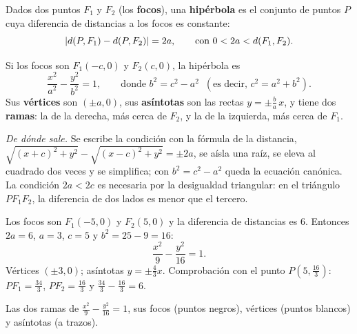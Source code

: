 \documentclass[11pt]{article}
\begin{document}
\begin{definicion}[Hipérbola]
Dados dos puntos $F_1$ y $F_2$ (los \textbf{focos}), una \textbf{hipérbola} es el
conjunto de puntos $P$ cuya diferencia de distancias a los focos es constante:
\[ \lvert d(P, F_1) - d(P, F_2)\rvert = 2a, \qquad \text{con } 0 < 2a < d(F_1, F_2). \]
\end{definicion}

\begin{teorema}
Si los focos son $F_1(-c, 0)$ y $F_2(c, 0)$, la hipérbola es
\[
  \frac{x^2}{a^2} - \frac{y^2}{b^2} = 1, \qquad \text{donde } b^2 = c^2 - a^2
  \;\;(\text{es decir, } c^2 = a^2 + b^2).
\]
Sus \textbf{vértices} son $(\pm a, 0)$, sus \textbf{asíntotas} son las rectas
$y = \pm \frac{b}{a}\,x$, y tiene dos \textbf{ramas}: la de la derecha, más cerca de
$F_2$, y la de la izquierda, más cerca de $F_1$.
\end{teorema}

\emph{De dónde sale.} Se escribe la condición con la fórmula de la distancia,
$\sqrt{(x + c)^2 + y^2} - \sqrt{(x - c)^2 + y^2} = \pm 2a$, se aísla una raíz, se
eleva al cuadrado dos veces y se simplifica; con $b^2 = c^2 - a^2$ queda la ecuación
canónica. La condición $2a < 2c$ es necesaria por la desigualdad triangular: en el
triángulo $PF_1F_2$, la diferencia de dos lados es menor que el tercero.

\begin{ejemplo}
Los focos son $F_1(-5, 0)$ y $F_2(5, 0)$ y la diferencia de distancias es $6$.
Entonces $2a = 6$, $a = 3$, $c = 5$ y $b^2 = 25 - 9 = 16$:
\[ \frac{x^2}{9} - \frac{y^2}{16} = 1. \]
Vértices $(\pm 3, 0)$; asíntotas $y = \pm \frac{4}{3}x$. Comprobación con el punto
$P\left(5, \frac{16}{3}\right)$: $PF_1 = \frac{34}{3}$, $PF_2 = \frac{16}{3}$ y
$\frac{34}{3} - \frac{16}{3} = 6$.
\begin{center}

{\small Las dos ramas de $\frac{x^2}{9} - \frac{y^2}{16} = 1$, sus focos (puntos
negros), vértices (puntos blancos) y asíntotas (a trazos).}
\end{center}
\end{ejemplo}
\end{document}
